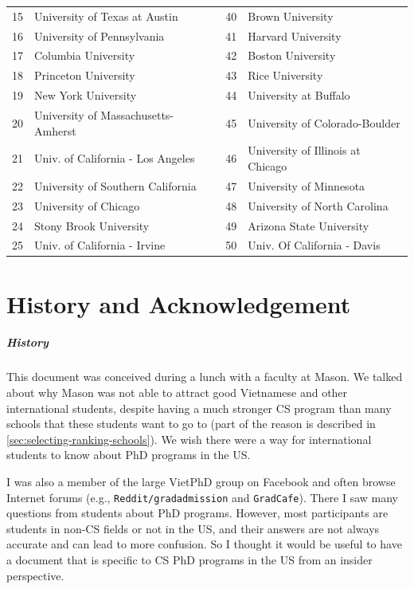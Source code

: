 \documentclass[oneside,11pt,dvipsnames]{book}
\newcommand{\red}[1]{{\color{red}{#1}}}
\begin{document}
\begin{table}[h]
\begin{tabular}{rl|rl}
    15 & University of Texas at Austin &40& Brown University \\
    16 & University of Pennsylvania &41 & Harvard University \\
    17 & Columbia University\red{$^*$} &42 & Boston University  \\
    18 & Princeton University\red{$^*$}  & 43& Rice University\\
    19 & New York University  & 44&  University at Buffalo\red{$^*$}\\
    20 &  University of Massachusetts-Amherst\red{$^*$} &45& University of Colorado-Boulder \\
    21 & Univ. of California - Los Angeles &46& University of Illinois at Chicago  \\
    22 & University of Southern California &47& University of Minnesota \\
    23 & University of Chicago &48& University of North Carolina\red{$^*$} \\
    24 & Stony Brook University\red{$^*$} &49& Arizona State University\red{$^*$} \\
    25 &  Univ. of California - Irvine&50& Univ. Of California - Davis \\
    \bottomrule
  \end{tabular}
\end{table}

\chapter{History and Acknowledgement}\label{sec:ack}
\paragraph{History} This document was conceived during a lunch with a faculty at Mason.  We talked about why Mason was not able to attract good Vietnamese and other international students, despite having a much stronger CS program than many schools that these students want to go to (part of the reason is described in \autoref{sec:selecting-ranking-schools}). We wish there were a way for international students to know about PhD programs in the US.

I was also a member of the large VietPhD group on Facebook and often browse Internet forums (e.g., \texttt{Reddit/gradadmission} and \texttt{GradCafe}). There I saw many questions from students about PhD programs.  However, most participants are students in non-CS fields or not in the US, and their answers are not always accurate and can lead to more confusion. So I thought it would be useful to have a document that is specific to CS PhD programs in the US from an insider perspective.
\end{document}
